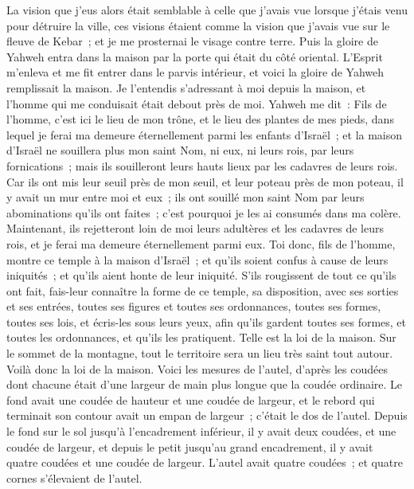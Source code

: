 \begin{multicols}{2}
La vision que j'eus alors était semblable à celle que j'avais vue lorsque j'étais venu pour détruire la ville, ces visions étaient comme la vision que j'avais vue sur le fleuve de Kebar~; et je me prosternai le visage contre terre.
Puis la gloire de Yahweh entra dans la maison par la porte qui était du côté oriental.
L'Esprit m'enleva et me fit entrer dans le parvis intérieur, et voici la gloire de Yahweh remplissait la maison.
Je l'entendis s'adressant à moi depuis la maison, et l'homme qui me conduisait était debout près de moi.
Yahweh me dit~: Fils de l'homme, c'est ici le lieu de mon trône, et le lieu des plantes de mes pieds, dans lequel je ferai ma demeure éternellement parmi les enfants d'Israël~; et la maison d'Israël ne souillera plus mon saint Nom, ni eux, ni leurs rois, par leurs fornications~; mais ils souilleront leurs hauts lieux par les cadavres de leurs rois.
Car ils ont mis leur seuil près de mon seuil, et leur poteau près de mon poteau, il y avait un mur entre moi et eux~; ils ont souillé mon saint Nom par leurs abominations qu'ils ont faites~; c'est pourquoi je les ai consumés dans ma colère.
Maintenant, ils rejetteront loin de moi leurs adultères et les cadavres de leurs rois, et je ferai ma demeure éternellement parmi eux.
Toi donc, fils de l'homme, montre ce temple à la maison d'Israël~; et qu'ils soient confus à cause de leurs iniquités~; et qu'ils aient honte de leur iniquité.
S'ils rougissent de tout ce qu'ils ont fait, fais-leur connaître la forme de ce temple, sa disposition, avec ses sorties et ses entrées, toutes ses figures et toutes ses ordonnances, toutes ses formes, toutes ses lois, et écris-les sous leurs yeux, afin qu'ils gardent toutes ses formes, et toutes les ordonnances, et qu'ils les pratiquent.
Telle est la loi de la maison. Sur le sommet de la montagne, tout le territoire sera un lieu très saint tout autour. Voilà donc la loi de la maison.
Voici les mesures de l'autel, d'après les coudées dont chacune était d'une largeur de main plus longue que la coudée ordinaire. Le fond avait une coudée de hauteur et une coudée de largeur, et le rebord qui terminait son contour avait un empan de largeur~; c'était le dos de l'autel.
Depuis le fond sur le sol jusqu'à l'encadrement inférieur, il y avait deux coudées, et une coudée de largeur, et depuis le petit jusqu'au grand encadrement, il y avait quatre coudées et une coudée de largeur.
L'autel avait quatre coudées~; et quatre cornes s'élevaient de l'autel.

\end{multicols}
